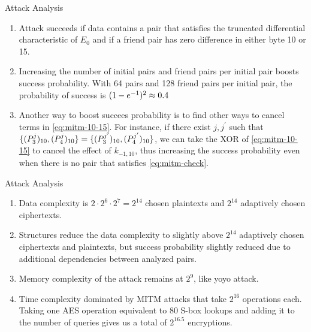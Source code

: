 \documentclass[notheorems]{beamer}
\theoremstyle{definition}
\theoremstyle{example}
\begin{document}
    \begin{frame}[<+->]{Attack Analysis}
        \begin{enumerate}
            \item Attack succeeds if data contains a pair that satisfies the
            truncated differential characteristic of \(E_0\) and if a friend
            pair has zero difference in either byte 10 or 15.
            \item Increasing the number of initial pairs and friend pairs per
            initial pair boosts success probability. With 64 pairs and 128
            friend pairs per initial pair, the probability of success is
            \((1 - e^{-1})^2 \approx 0.4\)
            \item Another way to boost succees probability is to find other ways
            to cancel terms in \eqref{eq:mitm-10-15}. For instance, if there
            exist \(j, j^\prime\) such that \(\{(P_3^j)_{10},
            (P_4^j)_{10}\} = \{(P_3^{j^\prime})_{10},
            (P_4^{j^\prime})_{10}\}\), we can take the XOR of
            \eqref{eq:mitm-10-15} to cancel the effect of \(k_{-1, 10}\), thus
            increasing the success probability even when there is no pair that
            satisfies \eqref{eq:mitm-check}.
            \seti
        \end{enumerate} 
    \end{frame}

    \begin{frame}[<+->]{Attack Analysis}
        \begin{enumerate}
            \conti
            \item Data complexity is \(2 \cdot 2^6 \cdot 2^7 = 2^{14}\) chosen
            plaintexts and \(2^{14}\) adaptively chosen ciphertexts.
            \item Structures reduce the data complexity to slightly above
            \(2^{14}\) adaptively chosen ciphertexts and plaintexts, but success
            probability slightly reduced due to additional dependencies between
            analyzed pairs.
            \item Memory complexity of the attack remains at \(2^9\), like yoyo
            attack.
            \item Time complexity dominated by MITM attacks that take \(2^{16}\)
            operations each. Taking one AES operation equivalent to 80 S-box
            lookups and adding it to the number of queries gives us a total of
            \(2^{16.5}\) encryptions.
        \end{enumerate} 
    \end{frame}
\end{document}
